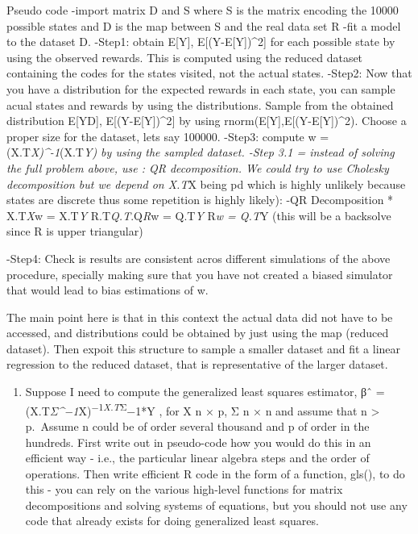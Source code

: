 \documentclass[]{article}
\providecommand{\tightlist}{%
  \setlength{\itemsep}{0pt}\setlength{\parskip}{0pt}}
\begin{document}
Pseudo code -import matrix D and S where S is the matrix encoding the
10000 possible states and D is the map between S and the real data set R
-fit a model to the dataset D. -Step1: obtain E{[}Y{]},
E{[}(Y-E{[}Y{]})\^{}2{]} for each possible state by using the observed
rewards. This is computed using the reduced dataset containing the codes
for the states visited, not the actual states. -Step2: Now that you have
a distribution for the expected rewards in each state, you can sample
acual states and rewards by using the distributions. Sample from the
obtained distribution E{[}Y\textbar{}D{]}, E{[}(Y-E{[}Y{]})\^{}2{]} by
using rnorm(E{[}Y{]},E{[}(Y-E{[}Y{]})\^{}2). Choose a proper size for
the dataset, lets say 100000. -Step3: compute w =
(X.T\emph{X)\^{}-1}(X.T\emph{Y) by using the sampled dataset. -Step 3.1
= instead of solving the full problem above, use : QR decomposition. We
could try to use Cholesky decomposition but we depend on X.T}X being pd
which is highly unlikely because states are discrete thus some
repetition is highly likely): -QR Decomposition * X.T\emph{X}w =
X.T\emph{Y } R.T\emph{Q.T}.Q\emph{R}w = Q.T\emph{Y } R\emph{w = Q.T}Y
(this will be a backsolve since R is upper triangular)

-Step4: Check is results are consistent acros different simulations of
the above procedure, specially making sure that you have not created a
biased simulator that would lead to bias estimations of w.

The main point here is that in this context the actual data did not have
to be accessed, and distributions could be obtained by just using the
map (reduced dataset). Then expoit this structure to sample a smaller
dataset and fit a linear regression to the reduced dataset, that is
representative of the larger dataset.

\begin{enumerate}
\def\labelenumi{\arabic{enumi}.}
\setcounter{enumi}{2}
\tightlist
\item
  Suppose I need to compute the generalized least squares estimator, βˆ
  = (X.T\emph{Σ\^{}−1}X)\textsuperscript{−1\emph{X.T}Σ}−1*Y , for X n ×
  p, Σ n × n and assume that n \textgreater{} p.~Assume n could be of
  order several thousand and p of order in the hundreds. First write out
  in pseudo-code how you would do this in an efficient way - i.e., the
  particular linear algebra steps and the order of operations. Then
  write efficient R code in the form of a function, gls(), to do this -
  you can rely on the various high-level functions for matrix
  decompositions and solving systems of equations, but you should not
  use any code that already exists for doing generalized least squares.
\end{enumerate}
\end{document}
